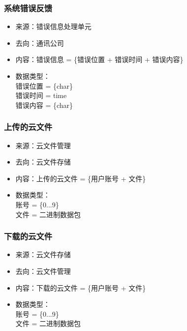             \subsubsection{系统错误反馈}
            \begin{itemize}
                \item 来源：错误信息处理单元
                \item 去向：通讯公司
                \item 内容：错误信息 = \{错误位置 + 错误时间 + 错误内容\}
                \item 数据类型：\\
                错误位置 = \{char\}\\
                错误时间 = time\\
                错误内容 = \{char\}\\
            \end{itemize}
            \subsubsection{上传的云文件}
            \begin{itemize}
            \item 来源：云文件管理
            \item 去向：云文件存储
            \item 内容：上传的云文件 = \{用户账号 + 文件\}
            \item 数据类型：\\
            账号 = \{0...9\}\\
            文件 = 二进制数据包\\
            \end{itemize}

            \subsubsection{下载的云文件}
            \begin{itemize}
            \item 来源：云文件存储
            \item 去向：云文件管理
            \item 内容：下载的云文件 = \{用户账号 + 文件\}
            \item 数据类型：\\
            账号 = \{0...9\}\\
            文件 = 二进制数据包\\
            \end{itemize}

